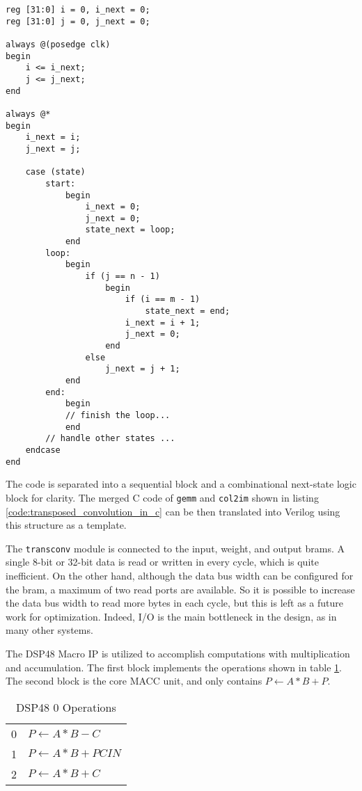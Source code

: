 \begin{code}
\begin{verbatim}
reg [31:0] i = 0, i_next = 0;
reg [31:0] j = 0, j_next = 0;

always @(posedge clk)
begin
    i <= i_next;
    j <= j_next;
end

always @*
begin
    i_next = i;
    j_next = j;

    case (state)
        start:
            begin
                i_next = 0;
                j_next = 0;
                state_next = loop;
            end
        loop:
            begin
                if (j == n - 1)
                    begin
                        if (i == m - 1)
                            state_next = end;
                        i_next = i + 1;
                        j_next = 0;
                    end
                else
                    j_next = j + 1;
            end
        end:
            begin
            // finish the loop...
            end
        // handle other states ...
    endcase
end
\end{verbatim}
\label{code:simple_for_verilog}
\end{code}

The code is separated into a sequential block and a combinational next-state logic block for clarity.
The merged C code of \texttt{gemm} and \texttt{col2im} shown in listing
\ref{code:transposed_convolution_in_c} can be then translated into Verilog using this structure
as a template.

The \texttt{transconv} module is connected to the input, weight, and output \glspl{bram}. A single
8-bit or 32-bit data is read or written in every cycle, which is quite inefficient. On the other hand,
although the data bus width can be configured for the \gls{bram}, a maximum of two read ports are available.
So it is possible to increase the data bus width to read more bytes in each cycle, but this is left
as a future work for optimization. Indeed, I/O is the main bottleneck in the design, as in many other systems.

The DSP48 Macro IP is utilized to accomplish computations with multiplication and accumulation. The first
block implements the operations shown in table \ref{table:dsp48_0_operations}. The second block is the core
MACC unit, and only contains $P \leftarrow A*B+P$.

\begin{table}[h]
  \centering
  \caption{DSP48 0 Operations}
  \begin{tabular}{l | l}
    0 & $P \leftarrow A*B-C$ \\
    1 & $P \leftarrow A*B+PCIN$ \\
    2 & $P \leftarrow A*B+C$
  \end{tabular}
  \label{table:dsp48_0_operations}
\end{table}

